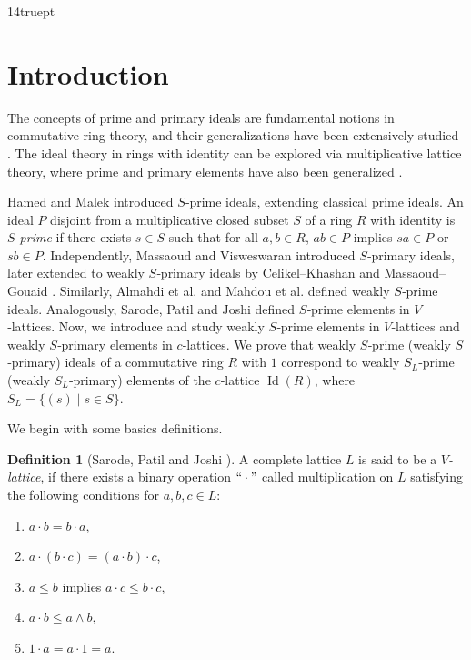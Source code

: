 \documentclass[10pt,twoside,a4paper]{amsart}
\numberwithin{equation}{section}
\theoremstyle{plain}
\theoremstyle{definition}
\newtheorem{defn}[lem]{Definition}
\begin{document}
	
	
	\baselineskip 14truept 
	\section{Introduction}%

 The concepts of prime and primary ideals are fundamental notions in commutative ring theory, and their generalizations have been extensively studied \cite{ABT, AB, AB1, AS, CK, HM, M, MG, V}. The ideal theory in rings with identity can be explored via multiplicative lattice theory, where prime and primary elements have also been generalized \cite{CYT, CUU, CUU1, JTY, MB, SPJ1, SPJ2}.
		
Hamed and Malek \cite{HM} introduced $S$‑prime ideals, extending classical prime ideals. An ideal $P$ disjoint from a multiplicative closed subset $S$  of a ring $R$ with identity is \textit{$S$‑prime} if there exists $ s\in S$ such that for all $a,b\in R$, $ab\in P$ implies $sa\in P$ or $sb\in P$. 
Independently, Massaoud \cite{M} and Visweswaran \cite{V} introduced $S$‑primary ideals, later extended to weakly $S$‑primary ideals by Celikel–Khashan \cite{CK} and Massaoud–Gouaid \cite{MG}. Similarly, Almahdi et al. \cite{ABT} and Mahdou et al. \cite{MMZ} defined weakly $S$‑prime ideals. Analogously,  Sarode, Patil and Joshi \cite{SPJ1} defined $S$‑prime elements in $V$‑lattices.  Now, we introduce and study weakly $S$‑prime elements in $V$‑lattices and weakly $S$‑primary elements in $c$‑lattices.
We prove that weakly $S$‑prime (weakly $S$‑primary) ideals of a commutative ring $R$ with $1$ correspond to weakly $S_L$‑prime (weakly $S_L$‑primary)  elements of the $c$‑lattice $\operatorname{Id} (R)$, where $S_L=\{ (s)\mid s\in S\}$. 
		 
We begin with some basics definitions. 

\begin{defn}[Sarode, Patil and Joshi \cite{SPJ1}] %
	A complete lattice $L$	is said to be a \textit{$V$-lattice}, if there exists a binary	operation $`` \cdot "$ called multiplication on $L$ satisfying the following conditions for $a, b, c \in L$: 
	\begin{enumerate} \item $ a \cdot b = b \cdot a $, 
		
	\item $a \cdot (b \cdot c) = (a \cdot b) \cdot c $, 
				
	\item $a \leq b$ implies $a \cdot c \leq b \cdot c $,
				
	\item $a \cdot b \leq a \wedge b $, 
				
	\item $1 \cdot a = a \cdot 1 = a$.
	\end{enumerate} 
\end{defn}
		
\end{document}
